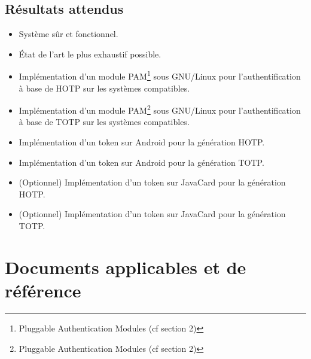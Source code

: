 \documentclass{"../../res/univ-projet"}
\begin{document}
    \subsection{Résultats attendus} 
        \begin{itemize}
            \item Système sûr et fonctionnel.
            \item État de l'art le plus exhaustif possible.
            \item Implémentation d'un module PAM\footnote{Pluggable Authentication Modules (cf section 2)} sous GNU/Linux pour l'authentification à base de HOTP sur les systèmes compatibles.
            \item Implémentation d'un module PAM\footnote{Pluggable Authentication Modules (cf section 2)} sous GNU/Linux pour l'authentification à base de TOTP sur les systèmes compatibles.
            \item Implémentation d'un token sur Android pour la génération HOTP.
            \item Implémentation d'un token sur Android pour la génération TOTP.
            \item (Optionnel) Implémentation d'un token sur JavaCard pour la génération HOTP.
            \item (Optionnel) Implémentation d'un token sur JavaCard pour la génération TOTP.
        \end{itemize}
        
\newpage
\section{Documents applicables et de référence}
\end{document}
